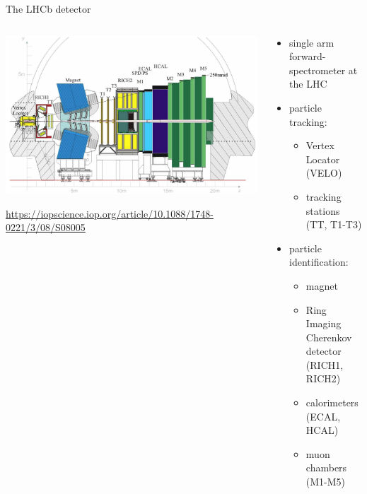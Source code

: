 \documentclass[aspectratio=1610, 10pt]{beamer}
\begin{document}
\begin{frame}{The LHCb detector}
  \begin{columns}
    \begin{column}{0.6\textwidth}
      \centering
      \includegraphics[width=\textwidth]{images/lhcb_detector.png}

      \tiny \url{https://iopscience.iop.org/article/10.1088/1748-0221/3/08/S08005}
    \end{column}
    \begin{column}{0.4\textwidth}
      \begin{itemize}
        \item single arm forward-spectrometer at the LHC %
        \item particle tracking: 
        \begin{itemize}
          \item Vertex Locator (VELO)
          \item tracking stations (TT, T1-T3)
        \end{itemize}
        \item particle identification: 
        \begin{itemize}
          \item magnet
          \item Ring Imaging Cherenkov detector (RICH1, RICH2)
          \item calorimeters (ECAL, HCAL)
          \item muon chambers (M1-M5)
        \end{itemize}
      \end{itemize}
    \end{column}
  \end{columns}
\end{frame}
\end{document}

